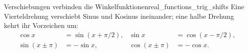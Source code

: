 \begin{KeyPointBox}{Verschiebungen verbinden die Winkelfunktionen}{real_functions_trig_shifts}
  Eine Vierteldrehung verschiebt Sinus und Kosinus ineinander;
  eine halbe Drehung kehrt ihr Vorzeichen um:
  \[
    \begin{aligned}
      \cos x&=\sin(x+\pi/2),&\sin x&=\cos(x-\pi/2),\\[0.6em]
      \sin(x\pm\pi)&=-\sin x,&\cos(x\pm\pi)&=-\cos x.
    \end{aligned}
  \]
  \begin{center}
  \end{center}
\end{KeyPointBox}
